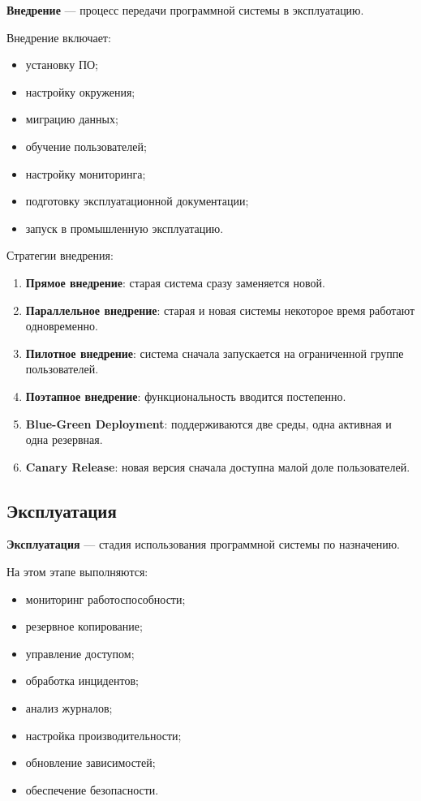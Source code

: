 \documentclass[12pt,a4paper]{article}
\begin{document}
\textbf{Внедрение} --- процесс передачи программной системы в эксплуатацию.

Внедрение включает:
\begin{itemize}
    \item установку ПО;
    \item настройку окружения;
    \item миграцию данных;
    \item обучение пользователей;
    \item настройку мониторинга;
    \item подготовку эксплуатационной документации;
    \item запуск в промышленную эксплуатацию.
\end{itemize}

Стратегии внедрения:
\begin{enumerate}
    \item \textbf{Прямое внедрение}: старая система сразу заменяется новой.
    \item \textbf{Параллельное внедрение}: старая и новая системы некоторое время работают одновременно.
    \item \textbf{Пилотное внедрение}: система сначала запускается на ограниченной группе пользователей.
    \item \textbf{Поэтапное внедрение}: функциональность вводится постепенно.
    \item \textbf{Blue-Green Deployment}: поддерживаются две среды, одна активная и одна резервная.
    \item \textbf{Canary Release}: новая версия сначала доступна малой доле пользователей.
\end{enumerate}

\subsection{Эксплуатация}

\textbf{Эксплуатация} --- стадия использования программной системы по назначению.

На этом этапе выполняются:
\begin{itemize}
    \item мониторинг работоспособности;
    \item резервное копирование;
    \item управление доступом;
    \item обработка инцидентов;
    \item анализ журналов;
    \item настройка производительности;
    \item обновление зависимостей;
    \item обеспечение безопасности.
\end{itemize}
\end{document}
